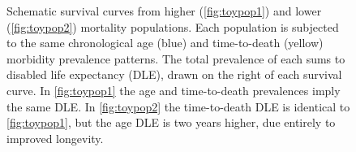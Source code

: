 \documentclass[12pt,oneside,a4paper]{article} %
\begin{document}
\begin{figure}
\caption{Schematic survival curves from higher (\ref{fig:toypop1}) and lower
(\ref{fig:toypop2}) mortality populations. Each population is
subjected to the same chronological age (blue) and time-to-death (yellow)
morbidity prevalence patterns. The total prevalence of each sums to disabled life expectancy
(DLE), drawn on the right of each survival curve. In \ref{fig:toypop1}
the age and time-to-death prevalences imply the same DLE. In
\ref{fig:toypop2} the time-to-death DLE is identical to \ref{fig:toypop1}, but
the age DLE is two years higher, due entirely to improved longevity.}
\label{fig:test}
\end{figure}
\end{document}
